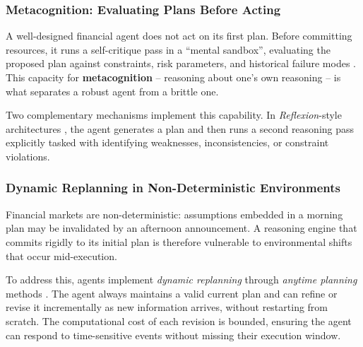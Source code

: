 \documentclass{article}
\begin{document}
\subsubsection{Metacognition: Evaluating Plans Before Acting}

A well-designed financial agent does not act on its first plan. Before
committing resources, it runs a self-critique pass in a ``mental sandbox'', evaluating the proposed plan against constraints, risk parameters, and historical failure modes \cite{shinn2023reflexion}. This capacity for \textbf{metacognition} -- reasoning about one's own reasoning -- is what separates a robust agent from a brittle one.

Two complementary mechanisms implement this capability. In \textit{Reflexion}-style architectures \cite{shinn2023reflexion}, the agent generates a plan and then runs a second reasoning pass explicitly tasked with identifying weaknesses, inconsistencies, or constraint violations. 


\subsubsection{Dynamic Replanning in Non-Deterministic Environments}

Financial markets are non-deterministic: assumptions embedded in a morning plan may be invalidated by an afternoon announcement. A reasoning engine that commits rigidly to its initial plan is therefore vulnerable to environmental shifts that occur mid-execution.

To address this, agents implement \textit{dynamic replanning} through
\textit{anytime planning} methods \cite{tonola2023anytime}. The agent always maintains a valid current plan and can refine or revise it incrementally as new information arrives, without restarting from scratch. The computational cost of each revision is bounded, ensuring the agent can respond to time-sensitive events without missing their execution window.

\end{document}
